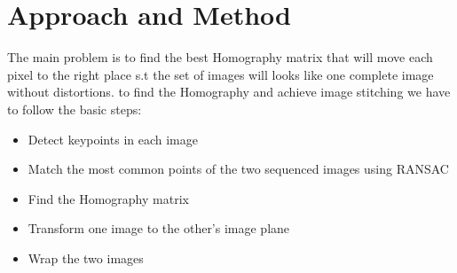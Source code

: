 \documentclass[12pt,a4paper]{report}
\begin{document}
\section*{Approach and Method}
The main problem is to find the best Homography matrix that will move each pixel to the right place s.t the set of images will looks like one complete image without distortions.
to find the Homography and achieve image stitching we have to follow the basic steps:
\begin{itemize}
	\item  Detect keypoints in each  image
	\item  Match the most common points of the two sequenced images using RANSAC
	\item Find the Homography matrix
	\item Transform one image to the other’s image plane
	\item Wrap the two images
\end{itemize}
\end{document}
